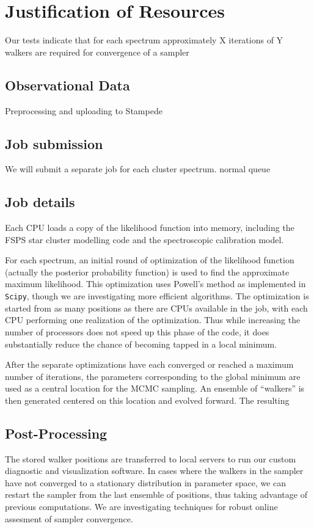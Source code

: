 \documentclass[11pt,preprint]{aastex}
\begin{document}
\section{Justification of Resources}
Our tests indicate that for each spectrum approximately X iterations of Y walkers are required for convergence of a sampler

\subsection{Observational Data}
Preprocessing and uploading to Stampede

\subsection{Job submission}
We will submit a separate job for each cluster spectrum. normal queue

\subsection{Job details}
Each CPU loads a copy of the likelihood function into memory, including the FSPS star cluster modelling code and the spectroscopic calibration model.

For each spectrum, an initial round of optimization of the likelihood function (actually the posterior probability function) is used to find the approximate maximum likelihood. 
This optimization uses Powell's method as implemented in \texttt{Scipy}, though we are investigating more efficient algorithms. 
The optimization is started from as many positions as there are CPUs available in the job, with each CPU  performing one realization of the optimization.  
Thus while increasing the number of processors does not speed up this phase of the code, it does substantially reduce the chance of becoming tapped in a local minimum.

After the separate optimizations have each converged or reached a maximum number of iterations, the parameters corresponding to the global minimum are used as a central location for the MCMC sampling.
An ensemble of ``walkers'' is then generated centered on this location and evolved forward.  
The resulting 

\subsection{Post-Processing}
The stored walker positions are transferred to local servers to run our custom diagnostic and visualization software.  
In cases where the walkers in the sampler have not converged to a stationary distribution in parameter space, we can restart the sampler from the last ensemble of positions, thus taking advantage of previous computations.  
We are investigating techniques for robust online assesment of sampler convergence.
\end{document}
